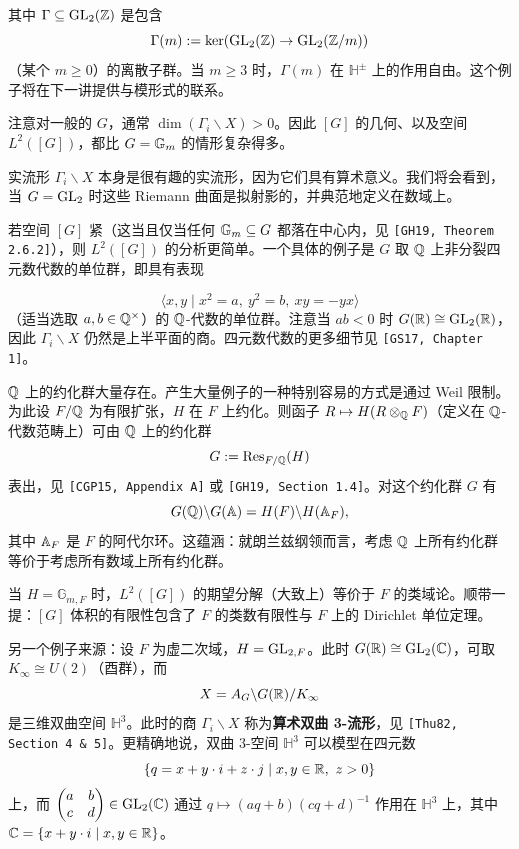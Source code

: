 其中 $\Gamma\subseteq\operatorname{GL}_2(\mathbb{Z})$ 是包含
\[
\Gamma(m):=\ker(\operatorname{GL}_2(\mathbb{Z})\to\operatorname{GL}_2(\mathbb{Z}/m))
\]
（某个 $m\ge0$）的离散子群。当 $m\ge3$ 时，$\Gamma(m)$ 在 $\mathbb{H}^\pm$ 上的作用自由。这个例子将在下一讲提供与模形式的联系。

注意对一般的 $G$，通常 $\dim(\Gamma_i\backslash X)>0$。因此 $[G]$ 的几何、以及空间 $L^2([G])$，都比 $G=\mathbb{G}_m$ 的情形复杂得多。

实流形 $\Gamma_i\backslash X$ 本身是很有趣的实流形，因为它们具有算术意义。我们将会看到，当 $G=\operatorname{GL}_2$ 时这些 Riemann 曲面是拟射影的，并典范地定义在数域上。

若空间 $[G]$ 紧（这当且仅当任何 $\mathbb{G}_m\subseteq G$ 都落在中心内，见 \texttt{[GH19, Theorem 2.6.2]}），则 $L^2([G])$ 的分析更简单。一个具体的例子是 $G$ 取 $\mathbb{Q}$ 上非分裂四元数代数的单位群，即具有表现

\[
\langle x,y\mid x^2=a,\ y^2=b,\ xy=-yx\rangle
\]
（适当选取 $a,b\in\mathbb{Q}^\times$）的 $\mathbb{Q}$-代数的单位群。注意当 $ab<0$ 时 $G(\mathbb{R})\cong\operatorname{GL}_2(\mathbb{R})$，因此 $\Gamma_i\backslash X$ 仍然是上半平面的商。四元数代数的更多细节见 \texttt{[GS17, Chapter 1]}。

$\mathbb{Q}$ 上的约化群大量存在。产生大量例子的一种特别容易的方式是通过 Weil 限制。为此设 $F/\mathbb{Q}$ 为有限扩张，$H$ 在 $F$ 上约化。则函子 $R\mapsto H(R\otimes_{\mathbb{Q}} F)$（定义在 $\mathbb{Q}$-代数范畴上）可由 $\mathbb{Q}$ 上的约化群
\[
G:=\operatorname{Res}_{F/\mathbb{Q}}(H)
\]
表出，见 \texttt{[CGP15, Appendix A]} 或 \texttt{[GH19, Section 1.4]}。对这个约化群 $G$ 有
\[
G(\mathbb{Q})\backslash G(\mathbb{A})=H(F)\backslash H(\mathbb{A}_F),
\]
其中 $\mathbb{A}_F$ 是 $F$ 的阿代尔环。这蕴涵：就朗兰兹纲领而言，考虑 $\mathbb{Q}$ 上所有约化群等价于考虑所有数域上所有约化群。

当 $H=\mathbb{G}_{m,F}$ 时，$L^2([G])$ 的期望分解（大致上）等价于 $F$ 的类域论。顺带一提：$[G]$ 体积的有限性包含了 $F$ 的类数有限性与 $F$ 上的 Dirichlet 单位定理。

另一个例子来源：设 $F$ 为虚二次域，$H=\operatorname{GL}_{2,F}$。此时 $G(\mathbb{R})\cong\operatorname{GL}_2(\mathbb{C})$，可取 $K_\infty\cong U(2)$（酉群），而
\[
X=A_G\backslash G(\mathbb{R})/K_\infty
\]
是三维双曲空间 $\mathbb{H}^3$。此时的商 $\Gamma_i\backslash X$ 称为\textbf{算术双曲 3-流形}，见 \texttt{[Thu82, Section 4 \& 5]}。更精确地说，双曲 3-空间 $\mathbb{H}^3$ 可以模型在四元数
\[
\{q=x+y\cdot i+z\cdot j\mid x,y\in\mathbb{R},\ z>0\}
\]
上，而 $\begin{pmatrix}a&b\\c&d\end{pmatrix}\in\operatorname{GL}_2(\mathbb{C})$ 通过 $q\mapsto(aq+b)(cq+d)^{-1}$ 作用在 $\mathbb{H}^3$ 上，其中 $\mathbb{C}=\{x+y\cdot i\mid x,y\in\mathbb{R}\}$。

